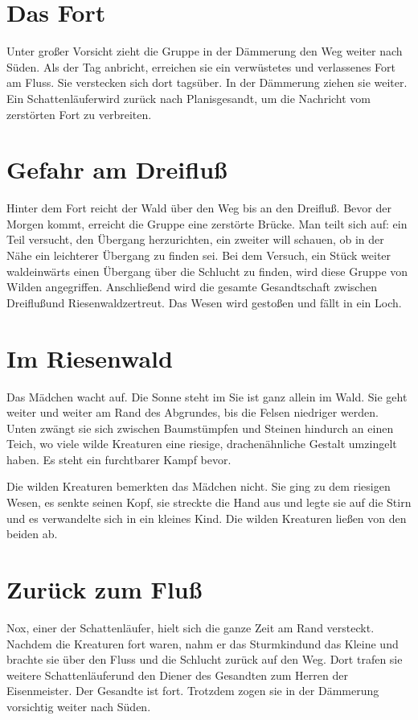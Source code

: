 \documentclass[12pt,a4paper,onecolumn,twoside,ngerman]{book}
\newcommand{\Sturmkind}{Sturmkind}
\newcommand{\Schattenlaufer}{Schattenläufer}
\newcommand{\Nox}{Nox}
\newcommand{\Dreifluss}{Dreifluß}
\newcommand{\Planis}{Planis}
\newcommand{\Grunland}{Grünland}
\newcommand{\Riesenwald}{Riesenwald}
\newcommand{\Eisenmeister}{Eisenmeister}
\begin{document}
\section{Das Fort}
Unter großer Vorsicht zieht die Gruppe in der Dämmerung den Weg weiter nach Süden. Als der Tag anbricht, erreichen sie ein verwüstetes und verlassenes Fort am Fluss. Sie verstecken sich dort tagsüber. In der Dämmerung ziehen sie weiter. Ein \Schattenlaufer wird zurück nach \Planis gesandt, um die Nachricht vom zerstörten Fort zu verbreiten.

\section{Gefahr am \Dreifluss}
Hinter dem Fort reicht der Wald über den Weg bis an den \Dreifluss. Bevor der Morgen kommt, erreicht die Gruppe eine zerstörte Brücke. Man teilt sich auf: ein Teil versucht, den Übergang herzurichten, ein zweiter will schauen, ob in der Nähe ein leichterer Übergang zu finden sei. Bei dem Versuch, ein Stück weiter waldeinwärts einen Übergang über die Schlucht zu finden, wird diese Gruppe von Wilden angegriffen. Anschließend wird die gesamte Gesandtschaft zwischen \Dreifluss und \Riesenwald zertreut. Das Wesen wird gestoßen und fällt in ein Loch.

\section{Im \Riesenwald}
Das Mädchen wacht auf. Die Sonne steht im Sie ist ganz allein im Wald. Sie geht weiter und weiter am Rand des Abgrundes, bis die Felsen niedriger werden. Unten zwängt sie sich zwischen Baumstümpfen und Steinen hindurch an einen Teich, wo viele wilde Kreaturen eine riesige, drachenähnliche Gestalt umzingelt haben. Es steht ein furchtbarer Kampf bevor.

Die wilden Kreaturen bemerkten das Mädchen nicht. Sie ging zu dem riesigen Wesen, es senkte seinen Kopf, sie streckte die Hand aus und legte sie auf die Stirn und es verwandelte sich in ein kleines Kind. Die wilden Kreaturen ließen von den beiden ab.

\section{Zurück zum Fluß}
\Nox, einer der \Schattenlaufer, hielt sich die ganze Zeit am Rand versteckt. Nachdem die Kreaturen fort waren, nahm er das \Sturmkind und das Kleine und brachte sie über den Fluss und die Schlucht zurück auf den Weg. Dort trafen sie weitere \Schattenlaufer und den Diener des Gesandten zum Herren der \Eisenmeister. Der Gesandte ist fort. Trotzdem zogen sie in der Dämmerung vorsichtig weiter nach Süden.
\end{document}
